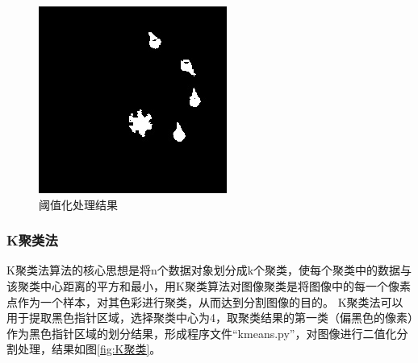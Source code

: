 \documentclass[a4paper]{ctexart}
\begin{document}
\begin{figure}[htbp]
\begin{minipage}[t]{0.25\textwidth}
		\includegraphics[width=\textwidth]{figure/threshold/img5.jpg}
	\end{minipage}
	\caption{阈值化处理结果}\label{fig:阈值化}
\end{figure}

\subsubsection{K聚类法}\label{sec:K聚类}
K聚类法\cite{chen2008fast}算法的核心思想是将n个数据对象划分成k个聚类，使每个聚类中的数据与该聚类中心距离的平方和最小，用K聚类算法对图像聚类是将图像中的每一个像素点作为一个样本，对其色彩进行聚类，从而达到分割图像的目的。
K聚类法可以用于提取黑色指针区域，选择聚类中心为4，取聚类结果的第一类（偏黑色的像素）作为黑色指针区域的划分结果，形成程序文件“kmeans.py”，对图像进行二值化分割处理，结果如图\ref{fig:K聚类}。
\end{document}
